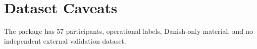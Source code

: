 \section{Dataset Caveats}
The package has 57 participants, operational labels, Danish-only material, and no independent external validation dataset.
